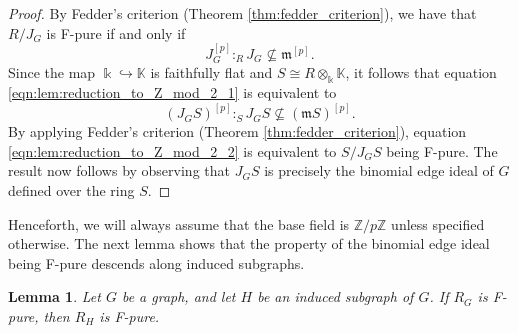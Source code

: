 \documentclass[12pt,a4paper]{amsart}
\theoremstyle{plain}
\newtheorem{lem}[thrm]{Lemma}
\def\blem{\begin{lem}}
\def\elem{\end{lem}}
\theoremstyle{definition}
\def\bproof{\begin{proof}}
\def\eproof{\end{proof}}
\theoremstyle{remark}
\let\hra=\hookrightarrow
\let\iso=\cong
\let\tensor=\otimes
\def\Z{\mathbb{Z}}
\def\K{\mathbb{K}}
\def\k{\Bbbk}
\def\m{\mathfrak{m}}
\renewcommand{\subset}{\subseteq}
\begin{document}
\bproof
By Fedder's criterion (Theorem \ref{thm:fedder_criterion}), we have that $R/J_{G}$ is F-pure if and only if 
\begin{equation}
    \label{eqn:lem:reduction_to_Z_mod_2_1}
    J_{G}^{[p]} :_{R} J_{G} \not\subset \m^{[p]}.
\end{equation}
Since the map $\k \hra \K$ is faithfully flat and $S \iso R \tensor_{\k} \K$, it follows that equation \eqref{eqn:lem:reduction_to_Z_mod_2_1} is equivalent to 
\begin{equation}
    \label{eqn:lem:reduction_to_Z_mod_2_2}
    (J_{G}S)^{[p]} :_{S} J_{G}S \not\subset (\m S)^{[p]}.
\end{equation}
By applying Fedder's criterion (Theorem \ref{thm:fedder_criterion}), equation \eqref{eqn:lem:reduction_to_Z_mod_2_2} is equivalent to $S/J_{G}S$ being F-pure. The result now follows by observing that $J_{G}S$ is precisely the binomial edge ideal of $G$ defined over the ring $S$.
\eproof

Henceforth, we will always assume that the base field is $\Z/p\Z$ unless specified otherwise. The next lemma shows that the property of the binomial edge ideal being F-pure descends along induced subgraphs.

\blem
\label{lem:F_split_descends_to_induced_subgraph}
Let $G$ be a graph, and let $H$ be an induced subgraph of $G$. If $R_{G}$ is F-pure, then $R_{H}$ is F-pure.
\elem
\end{document}
